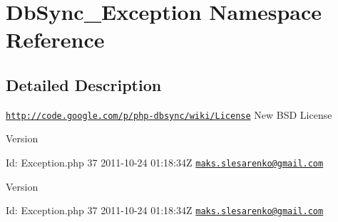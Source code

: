 \hypertarget{namespaceDbSync__Exception}{
\section{DbSync\_\-Exception Namespace Reference}
\label{namespaceDbSync__Exception}
}


\subsection{Detailed Description}
\href{http://code.google.com/p/php-dbsync/wiki/License}{\tt http://code.google.com/p/php-\/dbsync/wiki/License} New BSD License \begin{DoxyVersion}{Version}

\end{DoxyVersion}
\begin{DoxyParagraph}{Id:}
Exception.php 37 2011-\/10-\/24 01:18:34Z \href{mailto:maks.slesarenko@gmail.com}{\tt maks.slesarenko@gmail.com} 
\end{DoxyParagraph}


\begin{DoxyVersion}{Version}

\end{DoxyVersion}
\begin{DoxyParagraph}{Id:}
Exception.php 37 2011-\/10-\/24 01:18:34Z \href{mailto:maks.slesarenko@gmail.com}{\tt maks.slesarenko@gmail.com} 
\end{DoxyParagraph}
